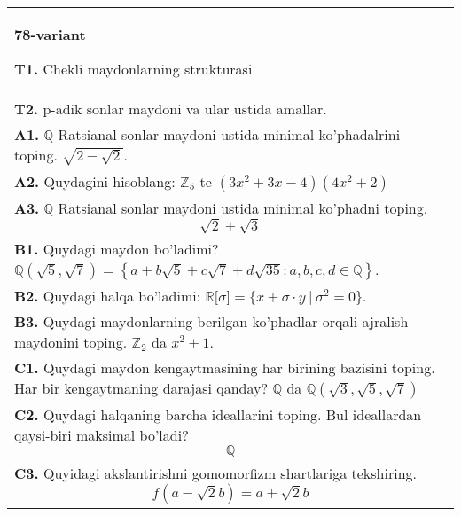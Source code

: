 \documentclass{article}
\begin{document}
\begin{tabular}{m{17cm}}
\textbf{78-variant}
\newline

\textbf{T1.} Chekli maydonlarning strukturasi \\
\textbf{T2.} p-adik sonlar maydoni va ular ustida amallar. \\
\textbf{A1.} \(\mathbb{Q}\) Ratsianal sonlar maydoni ustida minimal ko'phadalrini toping.
\(\sqrt{2 - \sqrt{2}}\). \\
\textbf{A2.} Quydagini hisoblang:
\(\mathbb{Z}_{5}\) te \(\left( 3x^{2} + 3x - 4 \right)\left( 4x^{2} + 2 \right)\) \\
\textbf{A3.} \(\mathbb{Q}\) Ratsianal sonlar maydoni ustida minimal ko'phadni toping.
\[\sqrt{2} + \sqrt{3}\] \\
\textbf{B1.} Quydagi maydon bo'ladimi?
\(\mathbb{Q}\left( \sqrt{5},\sqrt{7} \right) = \left\{ a + b\sqrt{5} + c\sqrt{7} + d\sqrt{35}:a,b,c,d \in \mathbb{Q} \right\}\). \\
\textbf{B2.} Quydagi halqa bo'ladimi:
\(\mathbb{R\lbrack}\sigma\rbrack = \{ x + \sigma \cdot y\ |\ \sigma^{2} = 0\}\). \\
\textbf{B3.} Quydagi maydonlarning berilgan ko'phadlar orqali ajralish maydonini toping.
\(\mathbb{Z}_{2}\) da \(x^{2} + 1\). \\
\textbf{C1.} Quydagi maydon kengaytmasining har birining bazisini toping. Har bir kengaytmaning darajasi qanday?
\(\mathbb{Q}\) da \(\mathbb{Q}\left( \sqrt{3},\sqrt{5},\sqrt{7} \right)\) \\
\textbf{C2.} Quydagi halqaning barcha ideallarini toping. Bul ideallardan qaysi-biri maksimal bo'ladi?
\[\mathbb{Q}\] \\
\textbf{C3.} Quyidagi akslantirishni gomomorfizm shartlariga tekshiring.
\[f\left( a - \sqrt{2}b \right) = a + \sqrt{2}b\] \\

\end{tabular}
\vspace{1cm}
\end{document}
